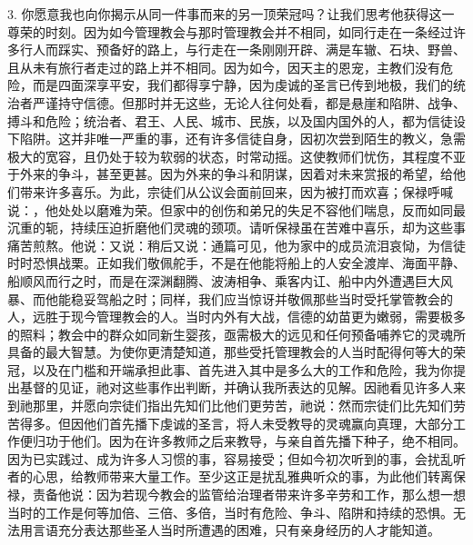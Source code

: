 3. 你愿意我也向你揭示从同一件事而来的另一顶荣冠吗？让我们思考他获得这一尊荣的时刻。因为如今管理教会与那时管理教会并不相同，如同行走在一条经过许多行人而踩实、预备好的路上，与行走在一条刚刚开辟、满是车辙、石块、野兽、且从未有旅行者走过的路上并不相同。因为如今，因天主的恩宠，主教们没有危险，而是四面深享平安，我们都得享宁静，因为虔诚的圣言已传到地极，我们的统治者严谨持守信德。但那时并无这些，无论人往何处看，都是悬崖和陷阱、战争、搏斗和危险；统治者、君王、人民、城市、民族，以及国内国外的人，都为信徒设下陷阱。这并非唯一严重的事，还有许多信徒自身，因初次尝到陌生的教义，急需极大的宽容，且仍处于较为软弱的状态，时常动摇。这使教师们忧伤，其程度不亚于外来的争斗，甚至更甚。因为外来的争斗和阴谋，因着对未来赏报的希望，给他们带来许多喜乐。为此，宗徒们从公议会面前回来，因为被打而欢喜；保禄呼喊说：，他处处以磨难为荣。但家中的创伤和弟兄的失足不容他们喘息，反而如同最沉重的轭，持续压迫折磨他们灵魂的颈项。请听保禄虽在苦难中喜乐，却为这些事痛苦煎熬。他说：又说：稍后又说：通篇可见，他为家中的成员流泪哀恸，为信徒时时恐惧战栗。正如我们敬佩舵手，不是在他能将船上的人安全渡岸、海面平静、船顺风而行之时，而是在深渊翻腾、波涛相争、乘客内讧、船中内外遭遇巨大风暴、而他能稳妥驾船之时；同样，我们应当惊讶并敬佩那些当时受托掌管教会的人，远胜于现今管理教会的人。当时内外有大战，信德的幼苗更为嫩弱，需要极多的照料；教会中的群众如同新生婴孩，亟需极大的远见和任何预备哺养它的灵魂所具备的最大智慧。为使你更清楚知道，那些受托管理教会的人当时配得何等大的荣冠，以及在门槛和开端承担此事、首先进入其中是多么大的工作和危险，我为你提出基督的见证，祂对这些事作出判断，并确认我所表达的见解。因祂看见许多人来到祂那里，并愿向宗徒们指出先知们比他们更劳苦，祂说：然而宗徒们比先知们劳苦得多。但因他们首先播下虔诚的圣言，将人未受教导的灵魂赢向真理，大部分工作便归功于他们。因为在许多教师之后来教导，与亲自首先播下种子，绝不相同。因为已实践过、成为许多人习惯的事，容易接受；但如今初次听到的事，会扰乱听者的心思，给教师带来大量工作。至少这正是扰乱雅典听众的事，为此他们转离保禄，责备他说：因为若现今教会的监管给治理者带来许多辛劳和工作，那么想一想当时的工作是何等加倍、三倍、多倍，当时有危险、争斗、陷阱和持续的恐惧。无法用言语充分表达那些圣人当时所遭遇的困难，只有亲身经历的人才能知道。\par

